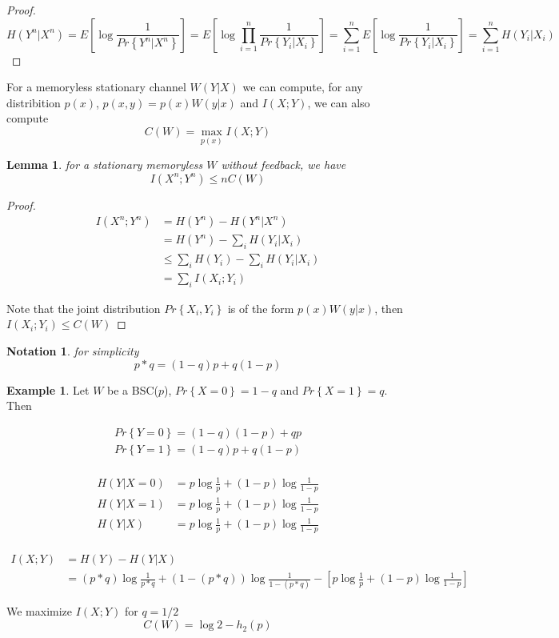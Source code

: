 \documentclass{article}
\newtheorem{lemma}[theorem]{Lemma}
\newtheorem{notation}{Notation}
\theoremstyle{definition} %
\newtheorem{example}{Example}
\renewcommand{\Pr}[1]{Pr\left\{#1\right\}}
\newcommand{\Ex}[1]{E\left[#1\right]}
\begin{document}
\begin{proof}
  \[
    H(Y^n|X^n) = \Ex{\log \frac 1 {\Pr{Y^n|X^n}}}
    = \Ex{\log \prod_{i=1}^n \frac 1 {\Pr{Y_i|X_i}}}
    = \sum_{i=1}^n \Ex{\log \frac 1 {\Pr{Y_i|X_i}}}
    = \sum_{i=1}^n H(Y_i|X_i)
  \]
\end{proof}

For a memoryless stationary channel $W(Y|X)$ we can compute, for any
distribition $p(x)$, $p(x,y) = p(x)W(y|x)$ and $I(X;Y)$, we can also compute
\[
  C(W) = \max_{p(x)} I(X;Y)
\]

\begin{lemma}
  for a stationary memoryless $W$ without feedback, we have
  \[
    I(X^n;Y^n) \leq n C(W)
  \]
\end{lemma}


\begin{proof}
  \begin{align*}
    I(X^n;Y^n) &= H(Y^n) - H(Y^n|X^n)\\
    &= H(Y^n)- \sum_i H(Y_i|X_i)\\
    &\leq \sum_i H(Y_i) - \sum_i H(Y_i|X_i)\\
    &= \sum_i I(X_i;Y_i)
  \end{align*}

  Note that the joint distribution $\Pr{X_i,Y_i}$ is of the form $p(x)W(y|x)$, then $I(X_i;Y_i) \leq C(W)$
\end{proof}

\begin{notation} for simplicity
  \[
    p\ast q = (1-q)p + q(1-p)
  \]
\end{notation}

\begin{example}
  Let $W$ be a BSC($p$), $\Pr{X=0} = 1 - q$ and $\Pr{X=1} = q$. Then

  \begin{align*}
    \Pr{Y=0} = (1-q)(1-p) + qp\\
    \Pr{Y=1} = (1-q)p + q(1-p)\\
  \end{align*}

  \begin{align*}
    H(Y|X=0) &= p \log \frac 1 p + (1-p) \log \frac 1 {1-p}\\
    H(Y|X=1) &= p \log \frac 1 p + (1-p) \log \frac 1 {1-p}\\
    H(Y|X) &= p \log \frac 1 p + (1-p) \log \frac 1 {1-p}\\
  \end{align*}

  \begin{align*}
    I(X;Y) &= H(Y) - H(Y|X)\\
    &=(p\ast q) \log \frac 1 {p\ast q} + (1-(p\ast q))\log \frac 1 {1-(p\ast q)}
    -
    \left[
    p \log \frac 1 p + (1-p) \log \frac 1 {1-p}
    \right]
  \end{align*}

  We maximize $I(X;Y)$ for $q=1/2$
  \[
    C(W) = \log 2 - h_2(p)
  \]

\end{example}
\end{document}
